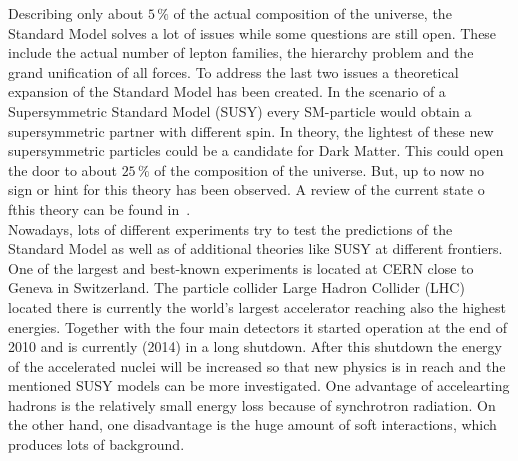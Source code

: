 Describing only about $5\,\%$ of the actual composition of the universe, the Standard Model solves a lot of issues while some questions are still open. These include the actual number of lepton families, the hierarchy problem and the grand unification of all forces. To address the last two issues a theoretical expansion of the Standard Model has been created. In the scenario of a Supersymmetric Standard Model (SUSY) every SM-particle would obtain a supersymmetric partner with different spin. In theory, the lightest of these new supersymmetric particles could be a candidate for Dark Matter. This could open the door to about $25\,\%$ of the composition of the universe. But, up to now no sign or hint for this theory has been observed. A review of the current state o fthis theory can be found in~\cite{Beringer:1900zz}. \\

Nowadays, lots of different experiments try to test the predictions of the Standard Model as well as of additional theories like SUSY at different frontiers. One of the largest and best-known experiments is located at CERN  close to Geneva in Switzerland. The particle collider Large Hadron Collider (LHC) located there is currently the world's largest accelerator reaching also the highest energies. Together with the four main detectors it started operation at the end of 2010 and is currently (2014) in a long shutdown. After this shutdown the energy of the accelerated nuclei will be increased so that new physics is in reach and the mentioned SUSY models can be more investigated. One advantage of accelearting hadrons is the relatively small energy loss because of synchrotron radiation. On the other hand, one disadvantage is the huge amount of soft interactions, which produces lots of background. \\

